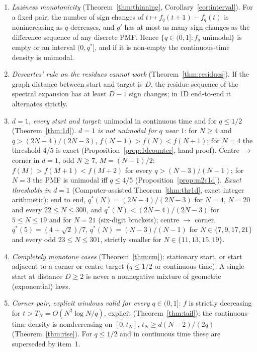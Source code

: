 \documentclass[11pt,a4paper]{article}
\theoremstyle{definition}
\begin{document}
\begin{enumerate}
\item \emph{Laziness monotonicity} (Theorem~\ref{thm:thinning}, Corollary~\ref{cor:interval}). For a fixed pair, the number of sign changes of $t\mapsto f_q(t+1)-f_q(t)$ is nonincreasing as $q$ decreases, and $g'$ has at most as many sign changes as the difference sequence of any discrete PMF. Hence $\{q\in(0,1]:f_q\text{ unimodal}\}$ is empty or an interval $(0,q^*]$, and if it is non-empty the continuous-time density is unimodal.
\item \emph{Descartes' rule on the residues cannot work} (Theorem~\ref{thm:residues}). If the graph distance between start and target is $D$, the residue sequence of the spectral expansion has at least $D-1$ sign changes; in 1D end-to-end it alternates strictly.
\item \emph{$d=1$, every start and target}: unimodal in continuous time and for $q\le 1/2$ (Theorem~\ref{thm:1d}). \emph{$d=1$ is not unimodal for $q$ near $1$}: for $N\ge4$ and $q>(2N-4)/(2N-3)$, $f(N-1)>f(N)<f(N+1)$; for $N=4$ the threshold $4/5$ is exact (Proposition~\ref{prop:1dcounter}, hand proof). Centre $\to$ corner in $d=1$, odd $N\ge7$, $M=(N-1)/2$: $f(M)>f(M+1)<f(M+2)$ for every $q>(N-3)/(N-1)$; for $N=3$ the PMF is unimodal iff $q\le4/5$ (Proposition~\ref{prop:m2c1d}). \emph{Exact thresholds in $d=1$} (Computer-assisted Theorem~\ref{thm:thr1d}, exact integer arithmetic): end to end, $q^*(N)=(2N-4)/(2N-3)$ for $N=4$, $N=20$ and every $22\le N\le300$, and $q^*(N)<(2N-4)/(2N-3)$ for $5\le N\le19$ and for $N=21$ (six-digit brackets); centre $\to$ corner, $q^*(5)=(4+\sqrt2)/7$, $q^*(N)=(N-3)/(N-1)$ for $N\in\{7,9,17,21\}$ and every odd $23\le N\le301$, strictly smaller for $N\in\{11,13,15,19\}$.
\item \emph{Completely monotone cases} (Theorem~\ref{thm:cm}): stationary start, or start adjacent to a corner or centre target ($q\le1/2$ or continuous time). A single start at distance $D\ge2$ is never a nonnegative mixture of geometric (exponential) laws.
\item \emph{Corner pair, explicit windows valid for every $q\in(0,1]$}: $f$ is strictly decreasing for $t>T_N=O(N^2\log N/q)$, explicit (Theorem~\ref{thm:tail}); the continuous-time density is nondecreasing on $[0,t_N]$, $t_N\ge d(N-2)/(2q)$ (Theorem~\ref{thm:rise}). For $q\le1/2$ and in continuous time these are superseded by item~1.

\end{enumerate}
\end{document}

